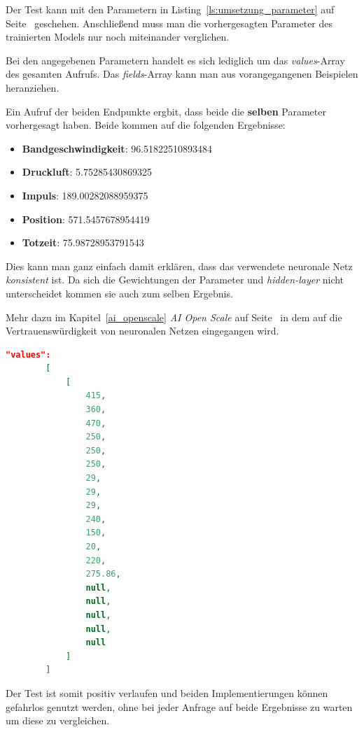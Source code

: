 Der Test kann mit den Parametern in Listing~\ref{ls:umsetzung_parameter} auf Seite~\pageref{ls:umsetzung_parameter} 
geschehen. Anschließend muss man die vorhergesagten Parameter des trainierten Models nur noch miteinander verglichen. 

Bei den angegebenen Parametern handelt es sich lediglich um das \textit{values}-Array des gesamten Aufrufs. Das 
\textit{fields}-Array kann man aus vorangegangenen Beispielen heranziehen.

Ein Aufruf der beiden Endpunkte ergbit, dass beide die \textbf{selben} Parameter vorhergesagt haben. Beide kommen auf 
die folgenden Ergebnisse:

\begin{itemize}
    \item \textbf{Bandgeschwindigkeit}: 96.51822510893484
    \item \textbf{Druckluft}: 5.75285430869325
    \item \textbf{Impuls}: 189.00282088959375
    \item \textbf{Position}: 571.5457678954419
    \item \textbf{Totzeit}: 75.98728953791543
\end{itemize}

Dies kann man ganz einfach damit erklären, dass das verwendete neuronale Netz \textit{konsistent} ist. Da sich die 
Gewichtungen der Parameter und \textit{hidden-layer} nicht unterscheidet kommen sie auch zum selben Ergebnis. 

Mehr dazu im Kapitel~\ref{ai_openscale} \textit{AI Open Scale} auf Seite~\pageref{ai_openscale} in dem auf die 
Vertrauenswürdigkeit von neuronalen Netzen eingegangen wird.

\begin{lstlisting}[language=JSON, caption=Parameter zum Test der beiden Implementierungen, label=ls:umsetzung_parameter]
    "values": 
        [
            [
                415,
                360,
                470,
                250,
                250,
                250,
                29,
                29,
                29,
                240,
                150,
                20,
                220,
                275.86,
                null,
                null,
                null,
                null,
                null
            ]
        ]
\end{lstlisting}

Der Test ist somit positiv verlaufen und beiden Implementierungen können gefahrlos genutzt werden, ohne bei jeder Anfrage
auf beide Ergebnisse zu warten um diese zu vergleichen.